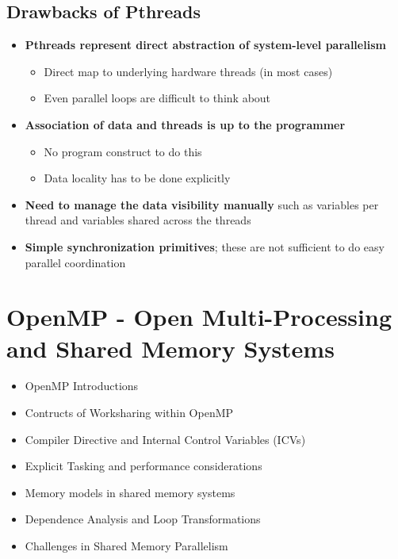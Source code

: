 \documentclass[12pt, a4paper]{report}
\begin{document}
\section{Drawbacks of Pthreads}
\begin{itemize}
    \item {\bfseries {Pthreads represent direct abstraction of system-level parallelism}}
            \begin{itemize}
                \item Direct map to underlying hardware threads (in most cases)
                \item Even parallel loops are difficult to think about
            \end{itemize}
    \item {\bfseries{Association of data and threads is up to the programmer}}
            \begin{itemize}
                \item No program construct to do this
                \item Data locality has to be done explicitly
            \end{itemize}
    \item {\bfseries {Need to manage the data visibility manually}} such as variables per thread and variables shared across the threads
    \item {\bfseries{Simple synchronization primitives}}; these are not sufficient to do easy parallel coordination
\end{itemize}





\chapter{OpenMP - Open Multi-Processing and Shared Memory Systems}
\begin{tcolorbox}[width=\textwidth,colback={white},title={In this chapter\dots},colbacktitle={lightslategray},coltitle=white]    
    \begin{itemize}
        \item OpenMP Introductions
        \item Contructs of Worksharing within OpenMP
        \item Compiler Directive and Internal Control Variables (ICVs)
        \item Explicit Tasking and performance considerations
        \item Memory models in shared memory systems
        \item Dependence Analysis and Loop Transformations
        \item Challenges in Shared Memory Parallelism
    \end{itemize}
 \end{tcolorbox}
\end{document}
